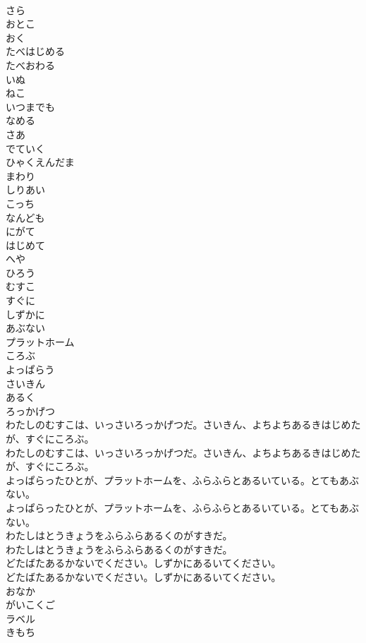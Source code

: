 \documentclass[8pt]{extreport}
\begin{document}
\begin{CJK}{UTF8}{min}
\\	さら
\\	おとこ
\\	おく
\\	たべはじめる
\\	たべおわる
\\	いぬ
\\	ねこ
\\	いつまでも
\\	なめる
\\	さあ
\\	でていく
\\	ひゃくえんだま
\\	まわり
\\	しりあい
\\	こっち
\\	なんども
\\	にがて
\\	はじめて
\\	へや
\\	ひろう
\\	むすこ
\\	すぐに
\\	しずかに
\\	あぶない
\\	プラットホーム
\\	ころぶ
\\	よっぱらう
\\	さいきん
\\	あるく
\\	ろっかげつ
\\	わたしのむすこは、いっさいろっかげつだ。さいきん、よちよちあるきはじめたが、すぐにころぶ。
\\	わたしのむすこは、いっさいろっかげつだ。さいきん、よちよちあるきはじめたが、すぐにころぶ。
\\	よっぱらったひとが、プラットホームを、ふらふらとあるいている。とてもあぶない。
\\	よっぱらったひとが、プラットホームを、ふらふらとあるいている。とてもあぶない。
\\	わたしはとうきょうをふらふらあるくのがすきだ。
\\	わたしはとうきょうをふらふらあるくのがすきだ。
\\	どたばたあるかないでください。しずかにあるいてください。
\\	どたばたあるかないでください。しずかにあるいてください。
\\	おなか
\\	がいこくご
\\	ラベル
\\	きもち

\end{CJK}
\end{document}
